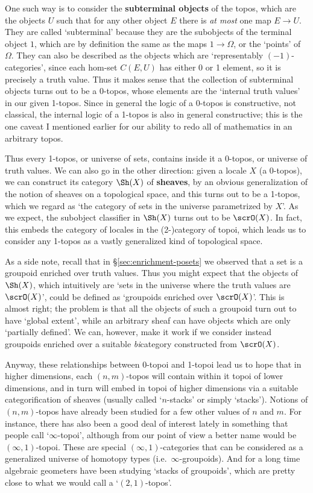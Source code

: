 \documentclass[12pt]{amsart}
\begin{document}
One such way is to consider the \textbf{subterminal objects} of the
topos, which are the objects $U$ such that for any other object $E$
there is \emph{at most} one map $E\to U$.  They are called
`subterminal' because they are the subobjects of the terminal object
$1$, which are by definition the same as the maps $1\to \Omega$, or
the `points' of $\Omega$.  They can also be described as the objects
which are `representably $(-1)$-categories', since each hom-set
$C(E,U)$ has either 0 or 1 element, so it is precisely a truth value.
Thus it makes sense that the collection of subterminal objects turns
out to be a 0-topos, whose elements are the `internal truth values' in
our given 1-topos.  Since in general the logic of a 0-topos is
constructive, not classical, the internal logic of a 1-topos is also
in general constructive; this is the one caveat I mentioned earlier
for our ability to redo all of mathematics in an arbitrary topos.

Thus every 1-topos, or universe of sets, contains inside it a 0-topos,
or universe of truth values.  We can also go in the other direction:
given a locale $X$ (a 0-topos), we can construct its category $\Sh(X)$
of \textbf{sheaves}, by an obvious generalization of the notion of
sheaves on a topological space, and this turns out to be a 1-topos,
which we regard as `the category of sets in the universe parametrized
by $X$'.  As we expect, the subobject classifier in $\Sh(X)$ turns out
to be $\scrO(X)$.  In fact, this embeds the category of locales in the
(2-)category of topoi, which leads us to consider any 1-topos as a
vastly generalized kind of topological space.

As a side note, recall that in \S\ref{sec:enrichment-posets} we
observed that a set is a groupoid enriched over truth values.  Thus
you might expect that the objects of $\Sh(X)$, which intuitively are
`sets in the universe where the truth values are $\scrO(X)$', could be
defined as `groupoids enriched over $\scrO(X)$'.  This is almost
right; the problem is that all the objects of such a groupoid turn out
to have `global extent', while an arbitrary sheaf can have objects
which are only `partially defined'.  We can, however, make it work if
we consider instead groupoids enriched over a suitable
\emph{bi}category constructed from $\scrO(X)$.

Anyway, these relationships between 0-topoi and 1-topoi lead us to
hope that in higher dimensions, each $(n,m)$-topos will contain within
it topoi of lower dimensions, and in turn will embed in topoi of
higher dimensions via a suitable categorification of sheaves (usually
called `$n$-stacks' or simply `stacks').  Notions of $(n,m)$-topos
have already been studied for a few other values of $n$ and $m$.  For
instance, there has also been a good deal of interest lately in
something that people call `$\infty$-topoi', although from our point
of view a better name would be $(\infty,1)$-topoi.  These are special
$(\infty,1)$-categories that can be considered as a generalized
universe of homotopy types (i.e.\ $\infty$-groupoids).  And for a long
time algebraic geometers have been studying `stacks of groupoids',
which are pretty close to what we would call a `$(2,1)$-topos'.
\end{document}
